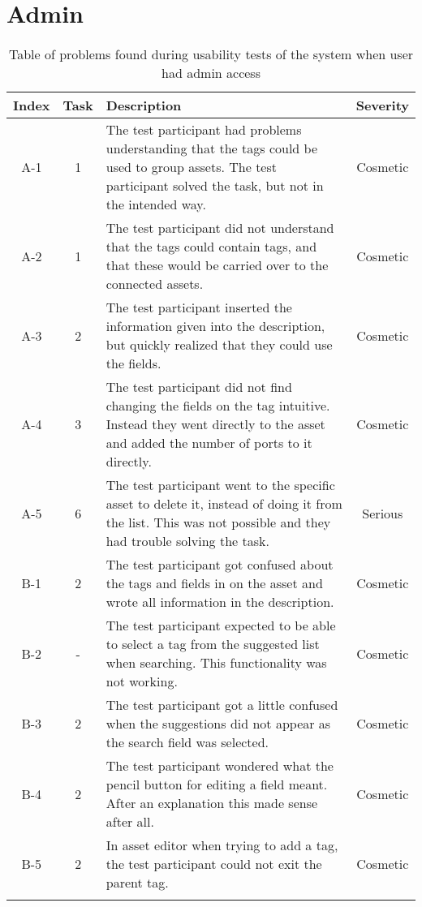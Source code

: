 \section*{Admin}
\begin{longtable}[c]{| c | c | p{8cm} | c |}
    \hline
    \textbf{Index} & \textbf{Task} & \textbf{Description} & \textbf{Severity}
    \\
    \hline
    A-1 & 1 & The test participant had problems understanding that the tags could be used to group assets. The test participant solved the task, but not in the intended way. &  Cosmetic
    \\
    \hline
    A-2 & 1 & The test participant did not understand that the tags could contain tags, and that these would be carried over to the connected assets. &  Cosmetic
    \\
    \hline
    A-3 & 2 & The test participant inserted the information given into the description, but quickly realized that they could use the fields. &  Cosmetic
    \\
    \hline
    A-4 & 3 & The test participant did not find changing the fields on the tag intuitive. Instead they went directly to the asset and added the number of ports to it directly. &  Cosmetic
    \\
    \hline
    A-5 & 6 & The test participant went to the specific asset to delete it, instead of doing it from the list. This was not possible and they had trouble solving the task. &  Serious
    \\
    \hline
    B-1 & 2 & The test participant got confused about the tags and fields in on the asset and wrote all information in the description. &  Cosmetic
    \\
    \hline
    B-2 & - & The test participant expected to be able to select a tag from the suggested list when searching. This functionality was not working. & Cosmetic
    \\
    \hline
    B-3 & 2 & The test participant got a little confused when the suggestions did not appear as the search field was selected. & Cosmetic
    \\
    \hline
    B-4 & 2 & The test participant wondered what the pencil button for editing a field meant. After an explanation this made sense after all. & Cosmetic
    \\
    \hline
    B-5 & 2 & In asset editor when trying to add a tag, the test participant could not exit the parent tag. & Cosmetic
    \\
    \hline
    \caption{Table of problems found during usability tests of the system when user had admin access}
    \label{tab:AdminProblems}
\end{longtable}

